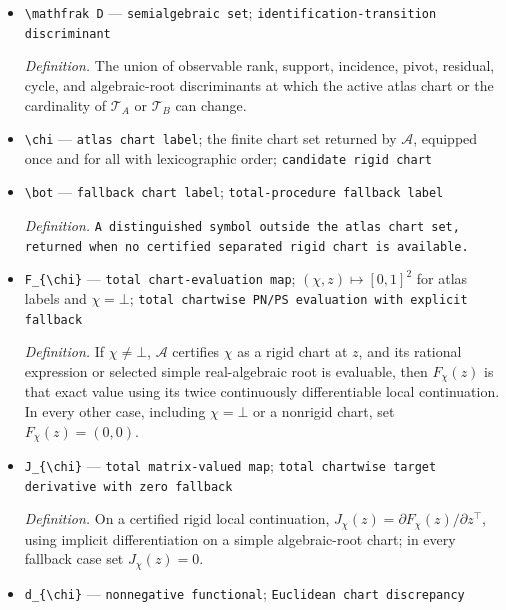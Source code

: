 \documentclass{article}
\begin{document}
\begin{itemize}
  \item \texttt{\textbackslash{}\allowbreak{}mathfrak D} --- \texttt{semialgebraic set}; \texttt{identification-\allowbreak{}transition discriminant}
  \par\smallskip\noindent\emph{Definition.} The union of observable rank, support, incidence, pivot, residual, cycle, and algebraic-root discriminants at which the active atlas chart or the cardinality of \(\mathcal T_A\) or \(\mathcal T_B\) can change.
  \item \texttt{\textbackslash{}\allowbreak{}chi} --- \texttt{atlas chart label}; the finite chart set returned by \(\mathscr A\), equipped once and for all with lexicographic order; \texttt{candidate rigid chart}
  \item \texttt{\textbackslash{}\allowbreak{}bot} --- \texttt{fallback chart label}; \texttt{total-\allowbreak{}procedure fallback label}
  \par\smallskip\noindent\emph{Definition.} \texttt{A distinguished symbol outside the atlas chart set,\allowbreak{} returned when no certified separated rigid chart is available.}
  \item \texttt{F\_\allowbreak{}\{\textbackslash{}\allowbreak{}chi\}\allowbreak{}} --- \texttt{total chart-\allowbreak{}evaluation map}; \((\chi,z)\mapsto[0,1]^2\) for atlas labels and \(\chi=\bot\); \texttt{total chartwise PN/\allowbreak{}PS evaluation with explicit fallback}
  \par\smallskip\noindent\emph{Definition.} If \(\chi\ne\bot\), \(\mathscr A\) certifies \(\chi\) as a rigid chart at \(z\), and its rational expression or selected simple real-algebraic root is evaluable, then \(F_{\chi}(z)\) is that exact value using its twice continuously differentiable local continuation. In every other case, including \(\chi=\bot\) or a nonrigid chart, set \(F_{\chi}(z)=(0,0)\).
  \item \texttt{J\_\allowbreak{}\{\textbackslash{}\allowbreak{}chi\}\allowbreak{}} --- \texttt{total matrix-\allowbreak{}valued map}; \texttt{total chartwise target derivative with zero fallback}
  \par\smallskip\noindent\emph{Definition.} On a certified rigid local continuation, \(J_{\chi}(z)=\partial F_{\chi}(z)/\partial z^{\top}\), using implicit differentiation on a simple algebraic-root chart; in every fallback case set \(J_{\chi}(z)=0\).
  \item \texttt{d\_\allowbreak{}\{\textbackslash{}\allowbreak{}chi\}\allowbreak{}} --- \texttt{nonnegative functional}; \texttt{Euclidean chart discrepancy}

\end{itemize}
\end{document}
